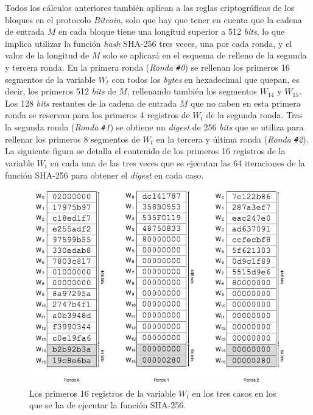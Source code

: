 \documentclass{article}
\begin{document}
        \vspace{3mm}
        
        Todos los cálculos anteriores también aplican a las reglas criptográficas de los bloques en el protocolo \textit{Bitcoin}, solo que hay que tener en cuenta que la cadena de entrada $M$ en cada bloque tiene una longitud superior a 512 \textit{bits}, lo que implica utilizar la función \textit{hash} SHA-256 tres veces, una por cada ronda, y el valor de la longitud de $M$ solo se aplicará en el esquema de relleno de la segunda y tercera ronda. En la primera ronda (\textit{Ronda \texttt{\#}0}) se rellenan los primeros 16 segmentos de la variable $W_t$ con todos los \textit{bytes} en hexadecimal que quepan, es decir, los primeros 512 \textit{bits} de $M$, rellenando también los segmentos $W_{14}$ y $W_{15}$. Los 128 \textit{bits} restantes de la cadena de entrada $M$ que no caben en esta primera ronda se reservan para los primeros 4 registros de $W_t$ de la segunda ronda. Tras la segunda ronda (\textit{Ronda \texttt{\#}1}) se obtiene un \textit{digest} de 256 \textit{bits} que se utiliza para rellenar los primeros 8 segmentos de $W_t$ en la tercera y última ronda (\textit{Ronda \texttt{\#}2}). La siguiente figura se detalla el contenido de los primeros 16 registros de la variable $W_{t}$ en cada una de las tres veces que se ejecutan las 64 iteraciones de la función SHA-256 para obtener el \textit{digest} en cada caso.
        \begin{figure}[H]
        \centering
            \includegraphics[scale=0.59]{img/Bitcoin_block_SHA_256_W0_W15_x3}
            \caption{Los primeros 16 registros de la variable $W_{t}$ en los tres casos en los que se ha de ejecutar la función SHA-256.}
        \end{figure}
        
\end{document}
